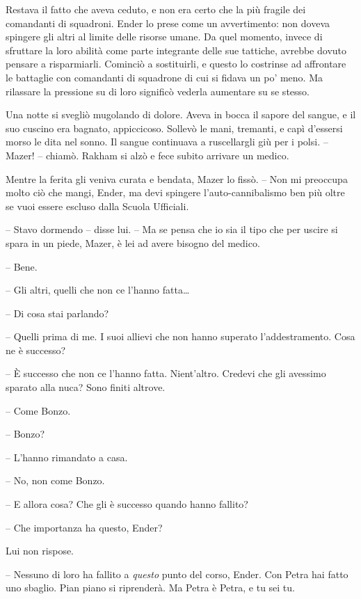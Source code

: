 {Restava il fatto che aveva ceduto, e non era certo che la più fragile
	dei comandanti di squadroni. Ender lo prese come un avvertimento: non
	doveva spingere gli altri al limite delle risorse umane. Da quel
	momento, invece di sfruttare la loro abilità come parte integrante delle
	sue tattiche, avrebbe dovuto pensare a risparmiarli. Cominciò a
	sostituirli, e questo lo costrinse ad affrontare le battaglie con
	comandanti di squadrone di cui si fidava un po' meno. Ma rilassare la
	pressione su di loro significò vederla aumentare su se stesso.}

{Una notte si svegliò mugolando di dolore. Aveva in bocca il sapore del
	sangue, e il suo cuscino era bagnato, appiccicoso. Sollevò le mani,
	tremanti, e capì d'essersi morso le dita nel sonno. Il sangue continuava
	a ruscellargli giù per i polsi. -- Mazer! -- chiamò. Rakham si alzò e
	fece subito arrivare un medico.}

{Mentre la ferita gli veniva curata e bendata, Mazer lo fissò. -- Non mi
	preoccupa molto ciò che mangi, Ender, ma devi spingere
	l'auto-cannibalismo ben più oltre se vuoi essere escluso dalla Scuola
	Ufficiali.}

{-- Stavo dormendo -- disse lui. -- Ma se pensa che io sia il tipo che
	per uscire si spara in un piede, Mazer, è lei ad avere bisogno del
	medico.}

{-- Bene.}

{-- Gli altri, quelli che non ce l'hanno fatta\ldots{}}

{-- Di cosa stai parlando?}

{-- Quelli prima di me. I suoi allievi che non hanno superato
	l'addestramento. Cosa ne è successo?}

{-- È successo che non ce l'hanno fatta. Nient'altro. Credevi che gli
	avessimo sparato alla nuca? Sono finiti altrove.}

{-- Come Bonzo.}

{-- Bonzo?}

{-- L'hanno rimandato a casa.}

{-- No, non come Bonzo.}

{-- E allora cosa? Che gli è successo quando hanno fallito?}

{-- Che importanza ha questo, Ender?}

{Lui non rispose.}

{-- Nessuno di loro ha fallito a \emph{questo} punto del corso, Ender.
	Con Petra hai fatto uno sbaglio. Pian piano si riprenderà. Ma Petra è
	Petra, e tu sei tu.}

